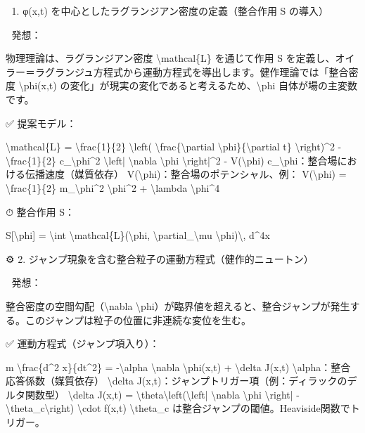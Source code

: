 \documentclass{article}
\begin{document}
🧩 1. φ(x,t) を中心としたラグランジアン密度の定義（整合作用 S の導入）

🧠 発想：

物理理論は、ラグランジアン密度 \textbackslash{}mathcal\{L\} を通じて作用 S を定義し、オイラー＝ラグランジュ方程式から運動方程式を導出します。健作理論では「整合密度 \textbackslash{}phi(x,t) の変化」が現実の変化であると考えるため、\textbackslash{}phi 自体が場の主変数です。

✅ 提案モデル：

\textbackslash{}mathcal\{L\} = \textbackslash{}frac\{1\}\{2\} \textbackslash{}left( \textbackslash{}frac\{\textbackslash{}partial \textbackslash{}phi\}\{\textbackslash{}partial t\} \textbackslash{}right)\textasciicircum{}2 - \textbackslash{}frac\{1\}\{2\} c\_\textbackslash{}phi\textasciicircum{}2 \textbackslash{}left| \textbackslash{}nabla \textbackslash{}phi \textbackslash{}right|\textasciicircum{}2 - V(\textbackslash{}phi)
c\_\textbackslash{}phi：整合場における伝播速度（媒質依存）
V(\textbackslash{}phi)：整合場のポテンシャル、例：
V(\textbackslash{}phi) = \textbackslash{}frac\{1\}\{2\} m\_\textbackslash{}phi\textasciicircum{}2 \textbackslash{}phi\textasciicircum{}2 + \textbackslash{}lambda \textbackslash{}phi\textasciicircum{}4

⏱ 整合作用 S：

S[\textbackslash{}phi] = \textbackslash{}int \textbackslash{}mathcal\{L\}(\textbackslash{}phi, \textbackslash{}partial\_\textbackslash{}mu \textbackslash{}phi)\textbackslash{}, d\textasciicircum{}4x

⚙️ 2. ジャンプ現象を含む整合粒子の運動方程式（健作的ニュートン）

🧠 発想：

整合密度の空間勾配（\textbackslash{}nabla \textbackslash{}phi）が臨界値を超えると、整合ジャンプが発生する。このジャンプは粒子の位置に非連続な変位を生む。

✅ 運動方程式（ジャンプ項入り）：

m \textbackslash{}frac\{d\textasciicircum{}2 x\}\{dt\textasciicircum{}2\} = -\textbackslash{}alpha \textbackslash{}nabla \textbackslash{}phi(x,t) + \textbackslash{}delta J(x,t)
\textbackslash{}alpha：整合応答係数（媒質依存）
\textbackslash{}delta J(x,t)：ジャンプトリガー項（例：ディラックのデルタ関数型）
\textbackslash{}delta J(x,t) = \textbackslash{}theta\textbackslash{}left(\textbackslash{}left| \textbackslash{}nabla \textbackslash{}phi \textbackslash{}right| - \textbackslash{}theta\_c\textbackslash{}right) \textbackslash{}cdot f(x,t)
\textbackslash{}theta\_c は整合ジャンプの閾値。Heaviside関数でトリガー。
\end{document}
